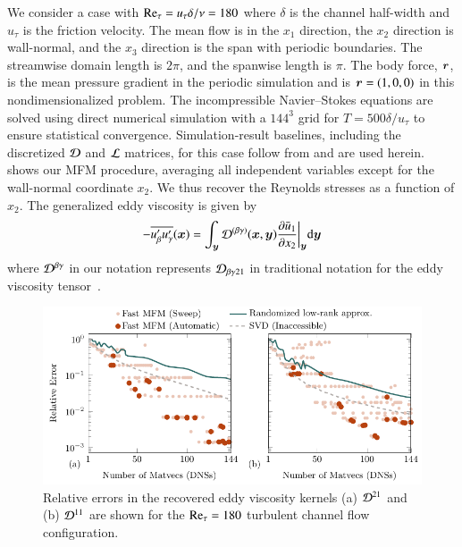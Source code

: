 \documentclass[11pt,sort&compress]{elsarticle}
\begin{document}
We consider a case with $\mbox{\text{Re}}_\tau = u_\tau \delta / \nu = 180$ where $\delta$ is the channel half-width and $u_\tau$ is the friction velocity.
The mean flow is in the $x_1$ direction, the $x_2$ direction is wall-normal, and the $x_3$ direction is the span with periodic boundaries.
The streamwise domain length is $2\pi$, and the spanwise length is $\pi$.
The body force, $\bm{r}$, is the mean pressure gradient in the periodic simulation and is $\bm{r}=(1,0,0)$ in this nondimensionalized problem. 
The incompressible Navier--Stokes equations are solved using direct numerical simulation with a $144^3$ grid for $T = 500 \delta/u_\tau$ to ensure statistical convergence.
Simulation-result baselines, including the discretized $\mathcal{D}$ and $\mathcal{L}$ matrices, for this case follow from \citet{park21} and are used herein.
 shows our MFM procedure, averaging all independent variables except for the wall-normal coordinate $x_2$.
We thus recover the Reynolds stresses as a function of $x_2$. The generalized eddy viscosity is given by
\begin{gather}
    - \overline{ u_\beta^\prime u_\gamma^\prime } (\bm{x}) = 
    \int_{\bm{y}} \mathcal{D}^{(\beta\gamma)} (\bm{x},\bm{y})
    \frac{ \partial \bar{u}_1}{\partial x_2} {\bigg|}_{\bm{y}} \text{d} \bm{y}
\end{gather}
where $\mathcal{D}^{\beta\gamma}$ in our notation represents $\mathcal{D}_{\beta\gamma21}$ in traditional notation for the eddy viscosity tensor~\cite{hamba2005nonlocal}.

\begin{figure}
    \centering
    \includegraphics[scale=1]{figures/err-peel-turbulent.pdf}
    \caption{
        Relative errors in the recovered eddy viscosity kernels (a) $\mathcal{D}^{21}$ and (b) $\mathcal{D}^{11}$ are shown for the $\mbox{\text{Re}}_\tau = 180$ turbulent channel flow configuration.
    }
    \label{f:error_peeeling_turb}
\end{figure}
\end{document}
